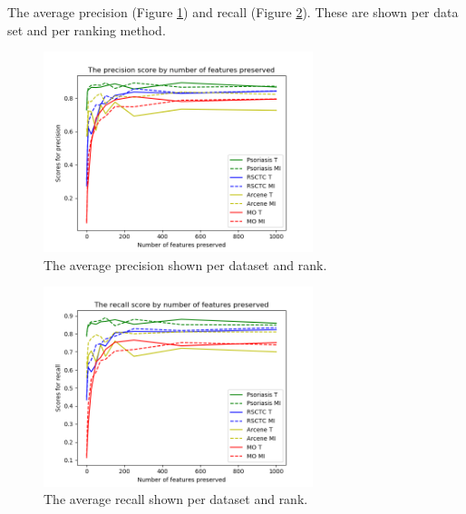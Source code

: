 	The average precision (Figure \ref{fig:DatasetRankPrecisionScores}) and recall (Figure \ref{fig:DatasetRankRecallScores}). These are shown per data set and per ranking method.
	
	\begin{figure}[H]
		\includegraphics[width=0.7\textwidth]{Data_Rank_Prec_Scores.png}
		\caption{The average precision shown per dataset and rank.}
		\label{fig:DatasetRankPrecisionScores}
	\end{figure}

	\begin{figure}[H]
		\includegraphics[width=0.7\textwidth]{Data_Rank_Rec_Scores.png}
		\caption{The average recall shown per dataset and rank.}
		\label{fig:DatasetRankRecallScores}
	\end{figure}